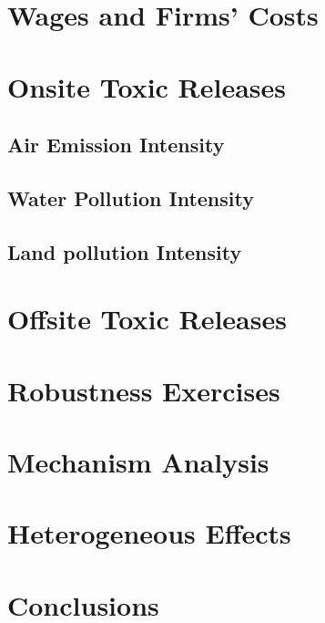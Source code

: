 \documentclass[12pt, english]{article}
\begin{document}
    \section{Wages and Firms' Costs}\label{sec:wages-and-firms-costs}


    \section{Onsite Toxic Releases}\label{sec:onsite-toxic-releases}

    \subsection{Air Emission Intensity}\label{subsec:air-emission-intensity}

    \subsection{Water Pollution Intensity}\label{subsec:water-pollution-intensity}

    \subsection{Land pollution Intensity}\label{subsec:land-pollution-intensity}


    \section{Offsite Toxic Releases}\label{sec:offsite-toxic-releases}


    \section{Robustness Exercises}\label{sec:robustness-exercises}


    \section{Mechanism Analysis}\label{sec:mechanism-analysis}


    \section{Heterogeneous Effects}\label{sec:heterogeneous-effects}


    \section{Conclusions}\label{sec:conclusions}
\end{document}
